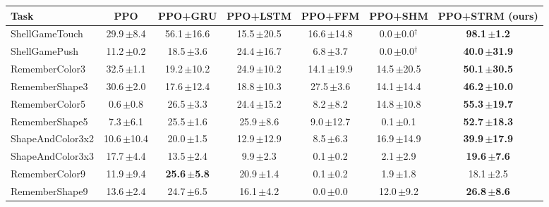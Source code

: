 \begin{table}[t]
\centering
\small
\setlength{\tabcolsep}{5pt}
\begin{tabular}{lcccccc}
\toprule
Task & PPO & PPO+GRU & PPO+LSTM & PPO+FFM & PPO+SHM & \textbf{PPO+STRM (ours)} \\
\midrule
ShellGameTouch & 29.9\,{\scriptsize$\pm$8.4} & 56.1\,{\scriptsize$\pm$16.6} & 15.5\,{\scriptsize$\pm$20.5} & 16.6\,{\scriptsize$\pm$14.8} & 0.0\,{\scriptsize$\pm$0.0}$^\dagger$ & \textbf{98.1\,{\scriptsize$\pm$1.2}} \\
ShellGamePush & 11.2\,{\scriptsize$\pm$0.2} & 18.5\,{\scriptsize$\pm$3.6} & 24.4\,{\scriptsize$\pm$16.7} & 6.8\,{\scriptsize$\pm$3.7} & 0.0\,{\scriptsize$\pm$0.0}$^\dagger$ & \textbf{40.0\,{\scriptsize$\pm$31.9}} \\
RememberColor3 & 32.5\,{\scriptsize$\pm$1.1} & 19.2\,{\scriptsize$\pm$10.2} & 24.9\,{\scriptsize$\pm$10.2} & 14.1\,{\scriptsize$\pm$19.9} & 14.5\,{\scriptsize$\pm$20.5} & \textbf{50.1\,{\scriptsize$\pm$30.5}} \\
RememberShape3 & 30.6\,{\scriptsize$\pm$2.0} & 17.6\,{\scriptsize$\pm$12.4} & 18.8\,{\scriptsize$\pm$10.3} & 27.5\,{\scriptsize$\pm$3.6} & 14.1\,{\scriptsize$\pm$14.4} & \textbf{46.2\,{\scriptsize$\pm$10.0}} \\
RememberColor5 & 0.6\,{\scriptsize$\pm$0.8} & 26.5\,{\scriptsize$\pm$3.3} & 24.4\,{\scriptsize$\pm$15.2} & 8.2\,{\scriptsize$\pm$8.2} & 14.8\,{\scriptsize$\pm$10.8} & \textbf{55.3\,{\scriptsize$\pm$19.7}} \\
RememberShape5 & 7.3\,{\scriptsize$\pm$6.1} & 25.5\,{\scriptsize$\pm$1.6} & 25.9\,{\scriptsize$\pm$8.6} & 9.0\,{\scriptsize$\pm$12.7} & 0.1\,{\scriptsize$\pm$0.1} & \textbf{52.7\,{\scriptsize$\pm$18.3}} \\
ShapeAndColor3x2 & 10.6\,{\scriptsize$\pm$10.4} & 20.0\,{\scriptsize$\pm$1.5} & 12.9\,{\scriptsize$\pm$12.9} & 8.5\,{\scriptsize$\pm$6.3} & 16.9\,{\scriptsize$\pm$14.9} & \textbf{39.9\,{\scriptsize$\pm$17.9}} \\
ShapeAndColor3x3 & 17.7\,{\scriptsize$\pm$4.4} & 13.5\,{\scriptsize$\pm$2.4} & 9.9\,{\scriptsize$\pm$2.3} & 0.1\,{\scriptsize$\pm$0.2} & 2.1\,{\scriptsize$\pm$2.9} & \textbf{19.6\,{\scriptsize$\pm$7.6}} \\
RememberColor9 & 11.9\,{\scriptsize$\pm$9.4} & \textbf{25.6\,{\scriptsize$\pm$5.8}} & 20.9\,{\scriptsize$\pm$1.4} & 0.1\,{\scriptsize$\pm$0.2} & 1.9\,{\scriptsize$\pm$1.8} & 18.1\,{\scriptsize$\pm$2.5} \\
RememberShape9 & 13.6\,{\scriptsize$\pm$2.4} & 24.7\,{\scriptsize$\pm$6.5} & 16.1\,{\scriptsize$\pm$4.2} & 0.0\,{\scriptsize$\pm$0.0} & 12.0\,{\scriptsize$\pm$9.2} & \textbf{26.8\,{\scriptsize$\pm$8.6}} \\

\end{tabular}
\end{table}

